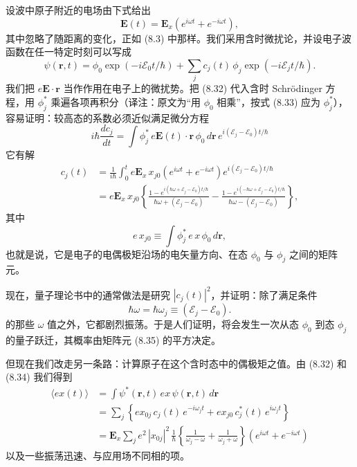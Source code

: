 设波中原子附近的电场由下式给出
\begin{equation*}
\mathbf{E}(t) = \mathbf{E}_x\left(e^{i\omega t} + e^{-i\omega t}\right),\tag{8.31}
\end{equation*}
其中忽略了随距离的变化，正如 (8.3) 中那样。我们采用含时微扰论，并设电子波函数在任一特定时刻可以写成
\begin{equation*}
\psi(\mathbf{r},t) = \phi_0\exp(-i\mathcal{E}_0 t/\hbar) + \sum_j c_j(t)\,\phi_j\exp(-i\mathcal{E}_j t/\hbar).\tag{8.32}
\end{equation*}
我们把 $e\mathbf{E}\cdot\mathbf{r}$ 当作作用在电子上的微扰势。把 (8.32) 代入含时 Schrödinger 方程，用 $\phi_j^{*}$ 乘遍各项再积分（译注：原文为“用 $\phi_0$ 相乘”，按式 (8.33) 应为 $\phi_j^{*}$），容易证明：较高态的系数必须近似满足微分方程
\begin{equation*}
i\hbar\frac{dc_j}{dt} = \int \phi_j^{*}\,e\mathbf{E}(t)\cdot\mathbf{r}\,\phi_0\,d\mathbf{r}\,e^{i(\mathcal{E}_j-\mathcal{E}_0)t/\hbar}\tag{8.33}
\end{equation*}
它有解
\begin{align*}
c_j(t) &= \frac{1}{i\hbar}\int_0^t e\mathbf{E}_x\,x_{j0}\left(e^{i\omega t}+e^{-i\omega t}\right)e^{i(\mathcal{E}_j-\mathcal{E}_0)t/\hbar}\\
&= e\mathbf{E}_x\,x_{j0}\left\{\frac{1-e^{i(\hbar\omega+\mathcal{E}_j-\mathcal{E}_0)t/\hbar}}{\hbar\omega+(\mathcal{E}_j-\mathcal{E}_0)} - \frac{1-e^{i(-\hbar\omega+\mathcal{E}_j-\mathcal{E}_0)t/\hbar}}{\hbar\omega-(\mathcal{E}_j-\mathcal{E}_0)}\right\},\tag{8.34}
\end{align*}
其中
\begin{equation*}
e\,x_{j0} \equiv \int \phi_j^{*}\,e\,x\,\phi_0\,d\mathbf{r},\tag{8.35}
\end{equation*}
也就是说，它是电子的电偶极矩沿场的电矢量方向、在态 $\phi_0$ 与 $\phi_j$ 之间的矩阵元。

现在，量子理论书中的通常做法是研究 $|c_j(t)|^2$，并证明：除了满足条件
\begin{equation*}
\hbar\omega = \hbar\omega_j \equiv (\mathcal{E}_j - \mathcal{E}_0).\tag{8.36}
\end{equation*}
的那些 $\omega$ 值之外，它都剧烈振荡。于是人们证明，将会发生一次从态 $\phi_0$ 到态 $\phi_j$ 的量子跃迁，其概率由矩阵元 (8.35) 的平方决定。

但现在我们改走另一条路：计算原子在这个含时态中的偶极矩之值。由 (8.32) 和 (8.34) 我们得到
\begin{align*}
\langle ex(t)\rangle &= \int \psi^{*}(\mathbf{r},t)\,ex\,\psi(\mathbf{r},t)\,d\mathbf{r}\\
&= \sum_j \left\{ex_{0j}\,c_j(t)\,e^{-i\omega_j t} + ex_{j0}\,c_j^{*}(t)\,e^{i\omega_j t}\right\}\\
&= \mathbf{E}_x\sum_j e^2\,|x_{0j}|^2\,\frac{1}{\hbar}\left\{\frac{1}{\omega_j-\omega}+\frac{1}{\omega_j+\omega}\right\}\left(e^{i\omega t}+e^{-i\omega t}\right)\tag{8.37}
\end{align*}
以及一些振荡迅速、与应用场不同相的项。

